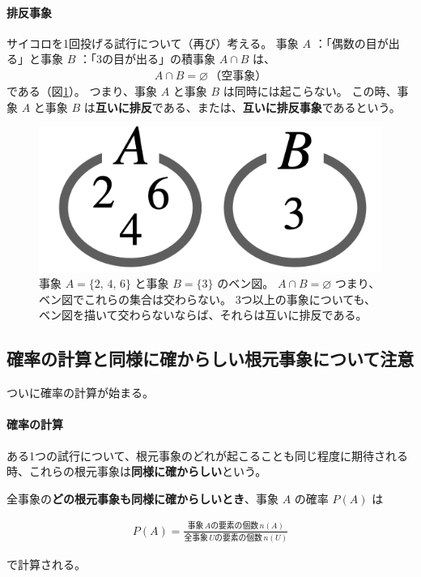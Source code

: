 \documentclass[12pt]{ltjsarticle}\usepackage{ifthen}\newcounter{enlarge}\setcounter{enlarge}{1}
\begin{document}
\paragraph{排反事象}

サイコロを1回投げる試行について（再び）考える。
事象 $A$ ：「偶数の目が出る」と事象 $B$ ：「3の目が出る」の積事象 $A \cap B$ は、
\begin{align}
  A \cap B = \varnothing\, \text{（空事象）} \label{eq:1.7}
\end{align}
である（図\ref{f:1.2}）。
つまり、事象 $A$ と事象 $B$ は同時には起こらない。
この時、事象 $A$ と事象 $B$ は\textbf{互いに排反}である、または、\textbf{互いに排反事象}であるという。

\begin{figure}[] 
\centering 
\includegraphics[width=6truecm]{./figure/f1-2.png}
\captionsetup{width=.9\linewidth}
\caption{%
  事象 $A = \{2,\, 4,\, 6\}$ と事象 $B = \{3\}$ のベン図。
  $A \cap B = \varnothing$ つまり、ベン図でこれらの集合は交わらない。
  3つ以上の事象についても、ベン図を描いて交わらないならば、それらは互いに排反である。
}
\label{f:1.2}
\end{figure}

\subsection{確率の計算と同様に確からしい根元事象について注意}

ついに確率の計算が始まる。

\paragraph{確率の計算}

ある1つの試行について、根元事象のどれが起こることも同じ程度に期待される時、これらの根元事象は\textbf{同様に確からしい}という。

全事象の\textbf{どの根元事象も同様に確からしいとき}、事象 $A$ の確率 $P(A)$ は
\begin{oframed}
  \begin{align}
    P(A) = \frac{\text{事象}\, A \text{の要素の個数}\, n(A)}{\text{全事象}\, U \text{の要素の個数}\, n(U)} \label{eq:1.8}
  \end{align}
\end{oframed}
\noindent
で計算される。
\end{document}
